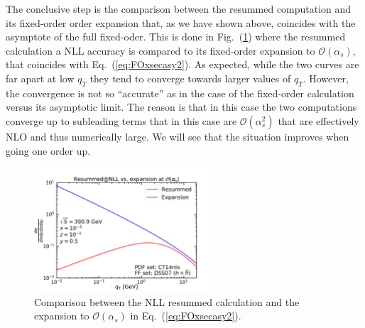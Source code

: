 \documentclass[10pt,a4paper]{article}
\begin{document}
The conclusive step is the comparison between the resummed computation
and its fixed-order order expansion that, as we have shown above,
coincides with the asymptote of the full fixed-oder. This is done in
Fig.~(\ref{fig:ResVsExp}) where the resummed calculation a NLL
accuracy is compared to its fixed-order expansion to
$\mathcal{O}(\alpha_s)$, that coincides with
Eq.~(\ref{eq:FOxsecasy2}). As expected, while the two curves are far
apart at low $q_T$ they tend to converge towards larger values of
$q_T$. However, the convergence is not so ``accurate'' as in the case
of the fixed-order calculation versus its asymptotic limit. The reason
is that in this case the two computations converge up to subleading
terms that in this case are $\mathcal{O}(\alpha_s^2)$ that are
effectively NLO and thus numerically large. We will see that the
situation improves when going one order up.
\begin{figure}[t]
  \begin{centering}
    \includegraphics[width=0.6\textwidth]{../plots/ResVsExp}
    \caption{Comparison between the NLL resummed calculation and the
      expansion to $\mathcal{O}(\alpha_s)$ in
      Eq.~(\ref{eq:FOxsecasy2}).\label{fig:ResVsExp}}
  \end{centering}
\end{figure}
\end{document}
